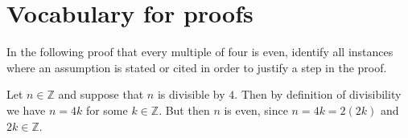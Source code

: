 \section{Vocabulary for proofs}
\label{secVocabulary}


\begin{exercise}
In the following proof that every multiple of four is even, identify all instances where an assumption is stated or cited in order to justify a step in the proof.

\begin{snippet}
Let $n \in \mathbb{Z}$ and suppose that $n$ is divisible by $4$. Then by definition of divisibility we have $n=4k$ for some $k \in \mathbb{Z}$. But then $n$ is even, since $n = 4k = 2(2k)$ and $2k \in \mathbb{Z}$.
\end{snippet}
\end{exercise}
